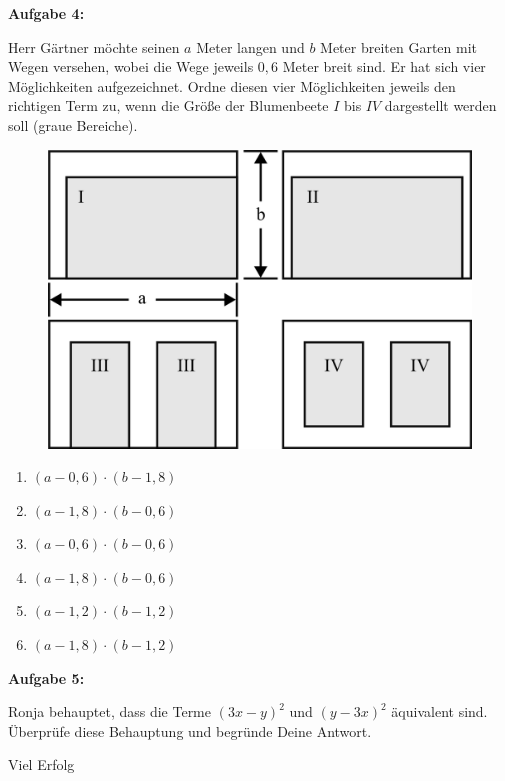 \documentclass[a4paper,12pt]{article}
\newcommand{\Aufgabe}[1]{
  {
  \vspace*{0.5cm}
  \textsf{\textbf{Aufgabe #1}}
  \vspace*{0.2cm}
  
  }
}
\begin{document}
\newpage
\Aufgabe{4: }

\begin{minipage}[t]{0.55\textwidth}
  Herr Gärtner möchte seinen $a$ Meter langen und $b$ Meter breiten Garten mit Wegen versehen, wobei die Wege jeweils $0,6$ Meter breit sind. Er hat sich vier Möglichkeiten aufgezeichnet. Ordne diesen vier Möglichkeiten jeweils den richtigen Term zu, wenn die Größe der Blumenbeete $I$ bis $IV$ dargestellt werden soll (graue Bereiche).
\end{minipage}
\hspace*{0.75cm}
\begin{minipage}[t]{0.40\textwidth}
  \begin{figure}[H]
    \vspace{-1cm}
    \centering
    \includegraphics[width=1\linewidth]{7G_2SA_image2.png}
  \end{figure}
\end{minipage}

\begin{enumerate}
  \item $(a-0,6)\cdot (b-1,8)$
  \item $(a-1,8)\cdot (b-0,6)$
  \item $(a-0,6)\cdot (b-0,6)$
  \item $(a-1,8)\cdot (b-0,6)$
  \item $(a-1,2)\cdot (b-1,2)$
  \item $(a-1,8)\cdot (b-1,2)$
\end{enumerate}

\vspace{2cm}

\Aufgabe{5: }
Ronja behauptet, dass die Terme $(3x - y)^2$ und $(y - 3x)^2$ äquivalent sind. Überprüfe diese Behauptung und begründe Deine Antwort.



\vspace{5cm}
\centerline{Viel Erfolg \faThumbsOUp }
\end{document}

